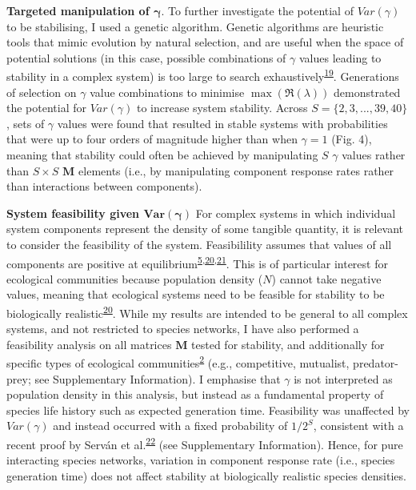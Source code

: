 \documentclass[]{article}
\begin{document}
\textbf{Targeted manipulation of \(\mathbf{\gamma}\)}. To further
investigate the potential of \(Var(\gamma)\) to be stabilising, I used a
genetic algorithm. Genetic algorithms are heuristic tools that mimic
evolution by natural selection, and are useful when the space of
potential solutions (in this case, possible combinations of \(\gamma\)
values leading to stability in a complex system) is too large to search
exhaustively\textsuperscript{\protect\hyperlink{ref-Hamblin2013}{19}}.
Generations of selection on \(\gamma\) value combinations to minimise
\(\max\left(\Re(\lambda)\right)\) demonstrated the potential for
\(Var(\gamma)\) to increase system stability. Across
\(S = \{2, 3, ..., 39, 40\}\), sets of \(\gamma\) values were found that
resulted in stable systems with probabilities that were up to four
orders of magnitude higher than when \(\gamma = 1\) (Fig. 4), meaning
that stability could often be achieved by manipulating \(S\) \(\gamma\)
values rather than \(S \times S\) \(\mathbf{M}\) elements (i.e., by
manipulating component response rates rather than interactions between
components).

\textbf{System feasibility given \(\mathbf{Var(\gamma)}\)} For complex
systems in which individual system components represent the density of
some tangible quantity, it is relevant to consider the feasibility of
the system. Feasibilility assumes that values of all components are
positive at
equilibrium\textsuperscript{\protect\hyperlink{ref-Grilli2017}{5},\protect\hyperlink{ref-Dougoud2018}{20},\protect\hyperlink{ref-Song2018}{21}}.
This is of particular interest for ecological communities because
population density (\(N\)) cannot take negative values, meaning that
ecological systems need to be feasible for stability to be biologically
realistic\textsuperscript{\protect\hyperlink{ref-Dougoud2018}{20}}.
While my results are intended to be general to all complex systems, and
not restricted to species networks, I have also performed a feasibility
analysis on all matrices \(\mathbf{M}\) tested for stability, and
additionally for specific types of ecological
communities\textsuperscript{\protect\hyperlink{ref-Allesina2012}{2}}
(e.g., competitive, mutualist, predator-prey; see Supplementary
Information). I emphasise that \(\gamma\) is not interpreted as
population density in this analysis, but instead as a fundamental
property of species life history such as expected generation time.
Feasibility was unaffected by \(Var(\gamma)\) and instead occurred with
a fixed probability of \(1/2^{S}\), consistent with a recent proof by
Serván et al.\textsuperscript{\protect\hyperlink{ref-Servan2018}{22}}
(see Supplementary Information). Hence, for pure interacting species
networks, variation in component response rate (i.e., species generation
time) does not affect stability at biologically realistic species
densities.
\end{document}
